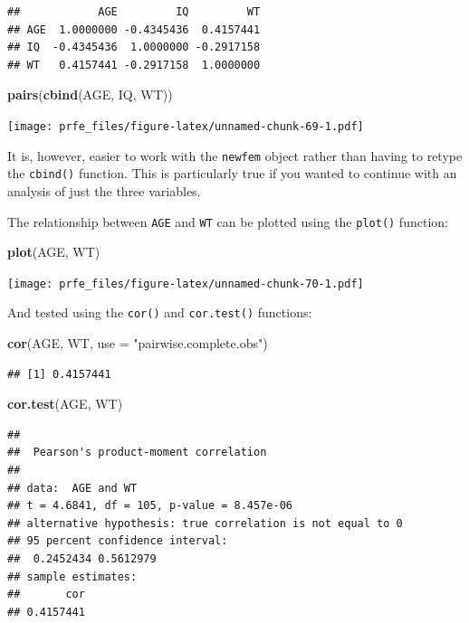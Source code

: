 \documentclass[]{book}
\newenvironment{Shaded}{\begin{snugshade}}{\end{snugshade}}
\newcommand{\KeywordTok}[1]{\textcolor[rgb]{0.13,0.29,0.53}{\textbf{#1}}}
\newcommand{\DataTypeTok}[1]{\textcolor[rgb]{0.13,0.29,0.53}{#1}}
\newcommand{\StringTok}[1]{\textcolor[rgb]{0.31,0.60,0.02}{#1}}
\newcommand{\NormalTok}[1]{#1}
\theoremstyle{definition}
\theoremstyle{definition}
\theoremstyle{definition}
\theoremstyle{remark}
\begin{document}
\begin{verbatim}
##            AGE         IQ         WT
## AGE  1.0000000 -0.4345436  0.4157441
## IQ  -0.4345436  1.0000000 -0.2917158
## WT   0.4157441 -0.2917158  1.0000000
\end{verbatim}

\begin{Shaded}
\begin{Highlighting}[]
\KeywordTok{pairs}\NormalTok{(}\KeywordTok{cbind}\NormalTok{(AGE, IQ, WT))}
\end{Highlighting}
\end{Shaded}

\texttt{[image: prfe\_files/figure-latex/unnamed-chunk-69-1.pdf]}

It is, however, easier to work with the \texttt{newfem} object rather
than having to retype the \texttt{cbind()} function. This is
particularly true if you wanted to continue with an analysis of just the
three variables.

The relationship between \texttt{AGE} and \texttt{WT} can be plotted
using the \texttt{plot()} function:

\begin{Shaded}
\begin{Highlighting}[]
\KeywordTok{plot}\NormalTok{(AGE, WT)}
\end{Highlighting}
\end{Shaded}

\texttt{[image: prfe\_files/figure-latex/unnamed-chunk-70-1.pdf]}

And tested using the \texttt{cor()} and \texttt{cor.test()} functions:

\begin{Shaded}
\begin{Highlighting}[]
\KeywordTok{cor}\NormalTok{(AGE, WT, }\DataTypeTok{use =} \StringTok{"pairwise.complete.obs"}\NormalTok{)}
\end{Highlighting}
\end{Shaded}

\begin{verbatim}
## [1] 0.4157441
\end{verbatim}

\begin{Shaded}
\begin{Highlighting}[]
\KeywordTok{cor.test}\NormalTok{(AGE, WT)}
\end{Highlighting}
\end{Shaded}

\begin{verbatim}
## 
##  Pearson's product-moment correlation
## 
## data:  AGE and WT
## t = 4.6841, df = 105, p-value = 8.457e-06
## alternative hypothesis: true correlation is not equal to 0
## 95 percent confidence interval:
##  0.2452434 0.5612979
## sample estimates:
##       cor 
## 0.4157441
\end{verbatim}
\end{document}
